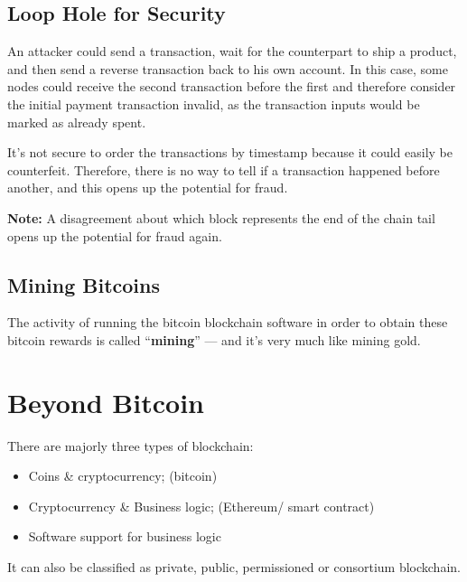 \documentclass{article}
\begin{document}
\subsection{Loop Hole for Security}
 An attacker could send a transaction, wait for the counterpart to ship a product, and then send a reverse transaction back to his own account. In this case, some nodes could receive the second transaction before the first and therefore consider the initial payment transaction invalid, as the transaction inputs would be marked as already spent.\par
 It’s not secure to order the transactions by timestamp because it could easily be counterfeit. Therefore, there is no way to tell if a transaction happened before another, and this opens up the potential for fraud.\\
 \par
 \textbf{Note:} A disagreement about which block represents the end of the chain tail opens up the potential for fraud again. 
 \subsection{Mining Bitcoins}
 The activity of running the bitcoin blockchain software in order to obtain these bitcoin rewards is called “\textbf{mining}” — and it’s very much like mining gold.
\section{Beyond Bitcoin}
There are majorly three types of blockchain:
\begin{itemize}
    \item Coins \& cryptocurrency; (bitcoin) 
    \item Cryptocurrency \& Business logic; (Ethereum/ smart contract)
    \item Software support for business logic
\end{itemize}
It can also be classified as private, public, permissioned or consortium blockchain. 
\end{document}
